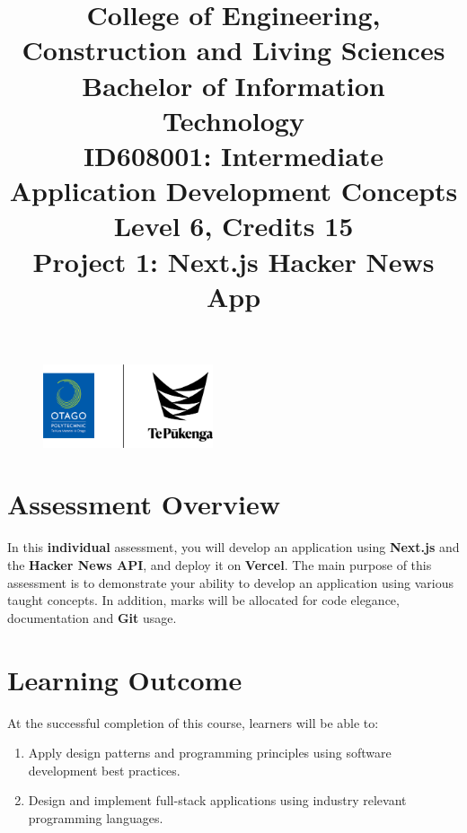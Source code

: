 \documentclass{article}
\author{}
\begin{document}
\begin{figure}
	\centering
	\includegraphics[width=50mm]{../../resources/img/logo.png}
\end{figure}

\title{College of Engineering, Construction and Living Sciences\\Bachelor of Information Technology\\ID608001: Intermediate Application Development Concepts\\Level 6, Credits 15\\\textbf{Project 1: Next.js Hacker News App}}
\date{}
\maketitle

\section*{Assessment Overview}
In this \textbf{individual} assessment, you will develop an application using \textbf{Next.js} and the \textbf{Hacker News API}, and deploy it on \textbf{Vercel}. The main purpose of this assessment is to demonstrate your ability to develop an application using various taught concepts. In addition, marks will be allocated for code elegance, documentation and \textbf{Git} usage.

\section*{Learning Outcome}
At the successful completion of this course, learners will be able to:
\begin{enumerate}
	\item Apply design patterns and programming principles using software development best practices.
	\item Design and implement full-stack applications using industry relevant programming languages.
\end{enumerate}
\end{document}

